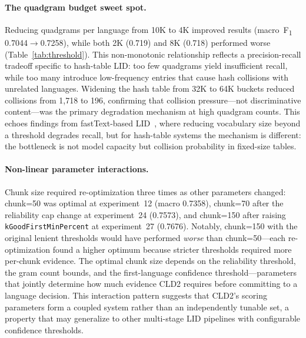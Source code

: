 \documentclass{article}
\newcommand{\fone}{F\textsubscript{1}}
\begin{document}
\paragraph{The quadgram budget sweet spot.}
Reducing quadgrams per language from 10K to 4K improved results (macro~\fone{} 0.7044$\to$0.7258), while both 2K (0.719) and 8K (0.718) performed worse (Table~\ref{tab:threshold}).
This non-monotonic relationship reflects a precision-recall tradeoff specific to hash-table LID: too few quadgrams yield insufficient recall, while too many introduce low-frequency entries that cause hash collisions with unrelated languages.
Widening the hash table from 32K to 64K buckets reduced collisions from 1,718 to 196, confirming that collision pressure---not discriminative content---was the primary degradation mechanism at high quadgram counts.
This echoes findings from fastText-based LID~\citep{joulin2017bag}, where reducing vocabulary size beyond a threshold degrades recall, but for hash-table systems the mechanism is different: the bottleneck is not model capacity but collision probability in fixed-size tables.

\paragraph{Non-linear parameter interactions.}
Chunk size required re-optimization three times as other parameters changed: chunk=50 was optimal at experiment~12 (macro 0.7358), chunk=70 after the reliability cap change at experiment~24 (0.7573), and chunk=150 after raising \texttt{kGoodFirstMinPercent} at experiment~27 (0.7676).
Notably, chunk=150 with the original lenient thresholds would have performed \emph{worse} than chunk=50---each re-optimization found a higher optimum because stricter thresholds required more per-chunk evidence.
The optimal chunk size depends on the reliability threshold, the gram count bounds, and the first-language confidence threshold---parameters that jointly determine how much evidence CLD2 requires before committing to a language decision.
This interaction pattern suggests that CLD2's scoring parameters form a coupled system rather than an independently tunable set, a property that may generalize to other multi-stage LID pipelines with configurable confidence thresholds.
\end{document}
